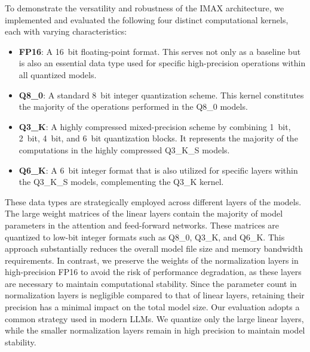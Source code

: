 To demonstrate the versatility and robustness of the IMAX architecture, we implemented and evaluated the following four distinct computational kernels, each with varying characteristics:
\begin{itemize}
    \item \textbf{FP16}: A \SI[number-unit-product=\nobreakdash-]{16}{bit} floating-point format. This serves not only as a baseline but is also an essential data type used for specific high-precision operations within all quantized models.
    \item \textbf{Q8\_0}: A standard \SI[number-unit-product=\nobreakdash-]{8}{bit} integer quantization scheme. This kernel constitutes the majority of the operations performed in the Q8\_0 models.
    \item \textbf{Q3\_K}: A highly compressed mixed-precision scheme by combining \SI[number-unit-product=\nobreakdash-]{1}{bit}, \SI[number-unit-product=\nobreakdash-]{2}{bit}, \SI[number-unit-product=\nobreakdash-]{4}{bit}, and \SI[number-unit-product=\nobreakdash-]{6}{bit} quantization blocks. It represents the majority of the computations in the highly compressed Q3\_K\_S models.
    \item \textbf{Q6\_K}: A \SI[number-unit-product=\nobreakdash-]{6}{bit} integer format that is also utilized for specific layers within the Q3\_K\_S models, complementing the Q3\_K kernel.
\end{itemize}

These data types are strategically employed across different layers of the models. 
The large weight matrices of the linear layers contain the majority of model parameters in the attention and feed-forward networks. 
These matrices are quantized to low-bit integer formats such as Q8\_0, Q3\_K, and Q6\_K.
This approach substantially reduces the overall model file size and memory bandwidth requirements. 
In contrast, we preserve the weights of the normalization layers in high-precision FP16 to avoid the risk of performance degradation, as these layers are necessary to maintain computational stability.
Since the parameter count in normalization layers is negligible compared to that of linear layers, retaining their precision has a minimal impact on the total model size. 
Our evaluation adopts a common strategy used in modern LLMs. 
We quantize only the large linear layers, while the smaller normalization layers remain in high precision to maintain model stability.

